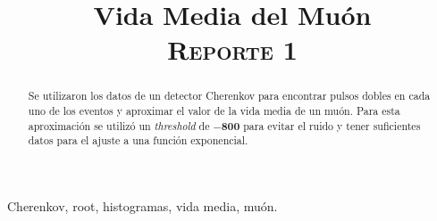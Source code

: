\documentclass[conference]{IEEEtran}
\begin{document}
\title{Vida Media del Muón \\
{\footnotesize \scshape{Reporte 1}}
}

\author{
}



\maketitle

\begin{abstract}
    Se utilizaron los datos de un detector Cherenkov para encontrar pulsos dobles en cada uno de los eventos y aproximar el valor de la vida media de un muón. Para esta aproximación se utilizó un \textit{threshold} de $\mathbf{-800}$ para evitar el ruido y tener suficientes datos para el ajuste a una función exponencial.
\end{abstract}

\begin{IEEEkeywords}
	Cherenkov, root, histogramas, vida media, muón.
\end{IEEEkeywords}

%
    
\end{document}
